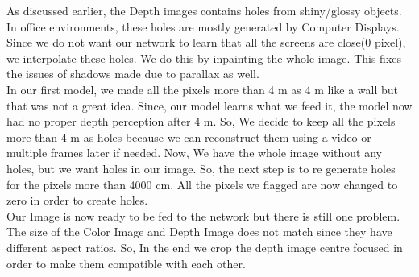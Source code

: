 As discussed earlier, the Depth images contains holes from shiny/glossy objects. In office environments, these holes are mostly generated by Computer Displays. Since we do not want our network to learn that all the screens are close(0 pixel), we interpolate these holes. We do this by inpainting the whole image. This fixes the issues of shadows made due to parallax as well. \\

In our first model, we made all the pixels more than 4 m as 4 m like a wall but that was not a great idea. Since, our model learns what we feed it, the model now had no proper depth perception after 4 m. So, We decide to keep all the pixels more than 4 m as holes because we can reconstruct them using a video or multiple frames later if needed. Now, We have the whole image without any holes, but we want holes in our image. So, the next step is to re generate holes for the pixels more than 4000 cm. All the pixels we flagged are now changed to zero in order to create holes. \\

Our Image is now ready to be fed to the network but there is still one problem. The size of the Color Image and Depth Image does not match since they have different aspect ratios. So, In the end we crop the depth image centre focused in order to make them compatible with each other.\\





\newpage